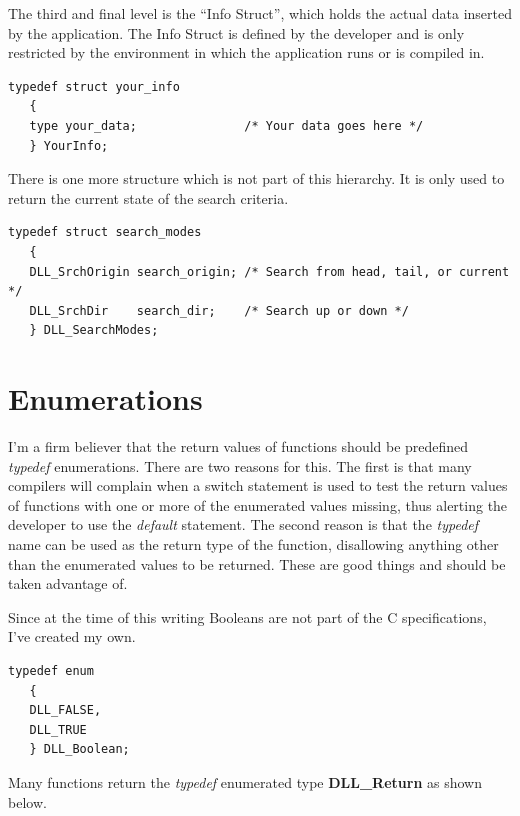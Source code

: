 \documentclass[10pt,letterpaper,titlepage]{article}
\begin{document}
\pagebreak
\noindent
The third and final level is the ``Info Struct'', which holds the actual data inserted by the application.  The Info Struct is defined by the developer and is only restricted by the environment in which the application runs or is compiled in.

\small
\begin{verbatim}
typedef struct your_info
   {
   type your_data;               /* Your data goes here */
   } YourInfo;
\end{verbatim}
\normalsize
\vspace{8pt}

\noindent
There is one more structure which is not part of this hierarchy.  It is only used to return the current state of the search criteria.

\small
\begin{verbatim}
typedef struct search_modes
   {
   DLL_SrchOrigin search_origin; /* Search from head, tail, or current */
   DLL_SrchDir    search_dir;    /* Search up or down */
   } DLL_SearchModes;
\end{verbatim}
\normalsize
\newpage

\section{Enumerations}
I'm a firm believer that the return values of functions should be predefined \emph{typedef} enumerations.  There are two reasons for this.  The first is that many compilers will complain when a switch statement is used to test the return values of functions with one or more of the enumerated values missing, thus alerting the developer to use the \emph{default} statement.   The second reason is that the \emph{typedef} name can be used as the return type of the function, disallowing anything other than the enumerated values to be returned.  These are good things and should be taken advantage of.
\vspace{8pt}

\noindent
Since at the time of this writing Booleans are not part of the C specifications, I've created my own.

\small
\begin{verbatim}
typedef enum
   {
   DLL_FALSE,
   DLL_TRUE
   } DLL_Boolean;
\end{verbatim}
\normalsize
\vspace{8pt}

\noindent
Many functions return the \emph{typedef} enumerated type \textbf{DLL\_Return} as shown below.
\end{document}

